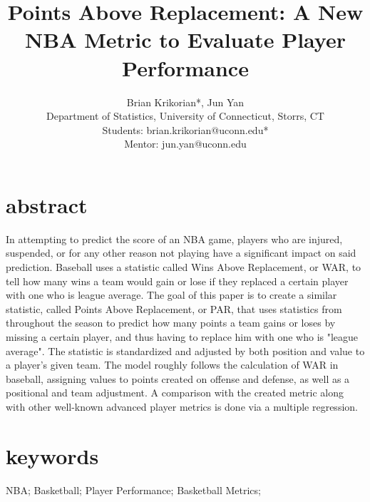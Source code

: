 \documentclass[12pt]{article}
\title{Points Above Replacement: A New NBA Metric to Evaluate Player Performance}
\author{
Brian Krikorian*, Jun Yan \\ \medskip 
Department of Statistics, University of Connecticut, Storrs, CT  \\  \medskip 
Students: brian.krikorian@uconn.edu* \\
Mentor: jun.yan@uconn.edu 
}
\begin{document}
\section*{abstract}
In attempting to predict the score of an NBA game, players who are injured, suspended, or for any other reason not 
playing have a significant impact on said prediction. Baseball uses a statistic called Wins Above Replacement, or 
WAR, to tell how many wins a 
team would gain or lose if they replaced a certain player with one who is league average. The goal of this paper is to 
create a similar statistic, called Points Above Replacement, or PAR, that uses statistics from throughout the season 
to predict how many points a 
team gains or loses by missing a certain player, and thus having to replace him with one who is "league average". 
The statistic is standardized and adjusted by both position and value to a player's given team. The model roughly 
follows the calculation of WAR in 
baseball, assigning values to points created on offense and defense, as well as a positional and team adjustment. A 
comparison with the created metric along with other well-known advanced player metrics is done via a multiple 
regression.

\section*{keywords} 
NBA; Basketball; Player Performance; Basketball Metrics;
\vspace{.12 in}
\end{document}
